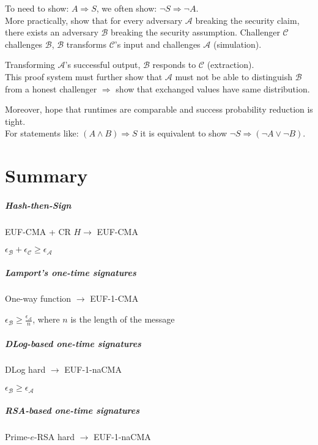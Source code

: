 \documentclass[oneside]{book}
\newcommand{\cA}[0]{\mathcal{A}}
\newcommand{\cB}[0]{\mathcal{B}}
\newcommand{\cC}[0]{\mathcal{C}}
\newcommand{\epsA}[0]{\epsilon_\cA}
\newcommand{\epsB}[0]{\epsilon_\cB}
\newcommand{\epsC}[0]{\epsilon_\cC}
\begin{document}
To need to show: $A \Rightarrow S$, we often show: $\neg S \Rightarrow \neg A$.\\

More practically, show that for every adversary $\cA$ breaking the security claim, there exists an adversary $\cB$ breaking the security assumption. Challenger $\cC$ challenges $\cB$, $\cB$ transforms $\cC$'s input and challenges $\cA$ (simulation).

Transforming $\cA$'s successful output, $\cB$ responds to $\cC$ (extraction).\\

This proof system must further show that $\cA$ must not be able to distinguish $\cB$ from a honest challenger $\Rightarrow$ show that exchanged values have same distribution.

Moreover, hope that runtimes are comparable and success probability reduction is tight.\\

For statements like: $(A \land B) \Rightarrow S$ it is equivalent to show $\neg S \Rightarrow (\neg A \lor \neg B)$.

\chapter{Summary}

\paragraph{Hash-then-Sign}
EUF-CMA + CR $H \rightarrow$ EUF-CMA

$\epsB + \epsC \ge \epsA$

\paragraph{Lamport's one-time signatures}
One-way function $\rightarrow$ EUF-1-CMA

$\epsB \ge \frac{\epsA}{n}$, where $n$ is the length of the message

\paragraph{DLog-based one-time signatures}
DLog hard $\rightarrow$ EUF-1-naCMA

$\epsB \ge \epsA$

\paragraph{RSA-based one-time signatures}
Prime-$e$-RSA hard $\rightarrow$ EUF-1-naCMA
\end{document}
